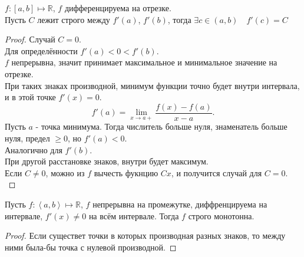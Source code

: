 \documentclass[11pt, oneside]{article}   	%
\begin{document}
            \begin{theorem}
                $f: \left[a, b\right] \mapsto \mathbb{R}$, $f$ дифференцируема на отрезке.\\
                Пусть $C$ лежит строго между $f'(a)$, $f'(b)$, тогда $\exists{c\in \left( a, b \right) }\quad f'(c) = C$
                \begin{proof}
                    Случай $C=0$.\\
                    Для определённости $f'(a) < 0 < f'(b)$.\\
                    $f$ непрерывна, значит принимает максимальное и минимальное значение на отрезке.\\
                    При таких знаках производной, минимум функции точно будет внутри интервала, и в этой точке $f'(x) = 0$.\\
                    \[ f'(a) = \lim\limits_{x \to a+} \frac{f(x)-f(a)}{x-a}  .\]
                    Пусть $a$ - точка минимума. Тогда числитель больше нуля, знаменатель больше нуля, предел $\ge 0$, но $f'(a) < 0$.\\
                    Аналогично для $f'(b)$.\\
                    При другой расстановке знаков, внутри будет максимум.\\
                    Если $C\neq 0$, можно из $f$ вычесть фукнцию $Cx$, и получится случай для $C=0$.\\
                \end{proof}
            \end{theorem}
            \begin{tlemma}
                Пусть $f: \left<a, b\right> \mapsto \mathbb{R}$, $f$ непрерывна на промежутке, диффренцируема на интервале, $f'(x) \neq 0$ на всём интервале. Тогда $f$ строго монотонна.
                \begin{proof}
                    Если существет точки в которых производная разных знаков, то между ними была-бы точка с нулевой производной.
                \end{proof}
            \end{tlemma}
\end{document}
